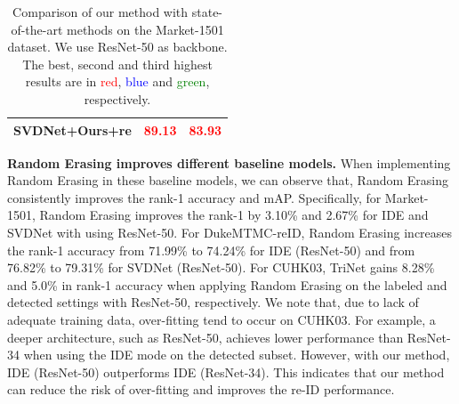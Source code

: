 \documentclass[10pt,twocolumn,letterpaper]{article}
\begin{document}
\begin{table}
\begin{center}
\begin{tabularx}{\linewidth}{ l|C|C }
SVDNet+Ours+re \cite{zhong2017re}& \textcolor{red}{89.13}& \textcolor{red}{83.93}\\
\hline
\end{tabularx}
\end{center}
\vspace{-.1in}
\caption{\label{tabel:Market-state} Comparison of our method with state-of-the-art methods on the Market-1501 dataset. We use ResNet-50 as backbone. The best, second and third
highest results are in \textcolor{red}{red}, \textcolor{blue}{blue} and \textcolor{green}{green}, respectively.}
\end{table}


\textbf{Random Erasing improves different baseline models.} When implementing Random Erasing in these baseline models, we can observe that, Random Erasing consistently improves the rank-1 accuracy and mAP. Specifically, for Market-1501, Random Erasing improves the rank-1 by 3.10\% and 2.67\% for IDE and SVDNet with using ResNet-50. For DukeMTMC-reID, Random Erasing increases the rank-1 accuracy from 71.99\% to 74.24\% for IDE (ResNet-50) and from 76.82\% to 79.31\% for SVDNet (ResNet-50). For CUHK03, TriNet gains 8.28\% and 5.0\% in rank-1 accuracy when applying Random Erasing on the labeled and detected settings with ResNet-50, respectively. We note that, due to lack of adequate training data, over-fitting tend to occur on CUHK03. For example,  a deeper architecture, such as ResNet-50,  achieves lower performance than ResNet-34 when using the IDE mode on the detected subset. However, with our method, IDE (ResNet-50) outperforms IDE (ResNet-34). This indicates that our method can reduce the risk of over-fitting and improves the re-ID performance.

\end{document}
